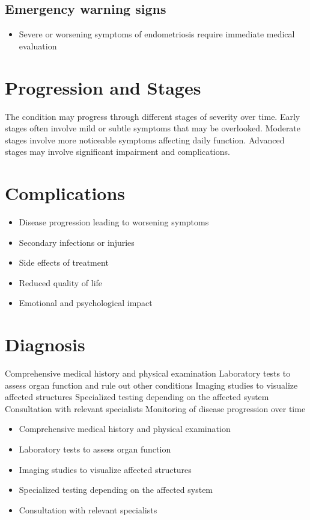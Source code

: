 \subsection{Emergency warning signs}
\begin{itemize}[noitemsep]
  \item Severe or worsening symptoms of endometriosis require immediate medical evaluation
\end{itemize}
\section{Progression and Stages}
The condition may progress through different stages of severity over time. Early stages often involve mild or subtle symptoms that may be overlooked. Moderate stages involve more noticeable symptoms affecting daily function. Advanced stages may involve significant impairment and complications.
\section{Complications}
\begin{itemize}[noitemsep]
  \item Disease progression leading to worsening symptoms
  \item Secondary infections or injuries
  \item Side effects of treatment
  \item Reduced quality of life
  \item Emotional and psychological impact
\end{itemize}
\section{Diagnosis}
Comprehensive medical history and physical examination Laboratory tests to assess organ function and rule out other conditions Imaging studies to visualize affected structures Specialized testing depending on the affected system Consultation with relevant specialists Monitoring of disease progression over time

\begin{itemize}[noitemsep]
  \item Comprehensive medical history and physical examination
  \item Laboratory tests to assess organ function
  \item Imaging studies to visualize affected structures
  \item Specialized testing depending on the affected system
  \item Consultation with relevant specialists
\end{itemize}
